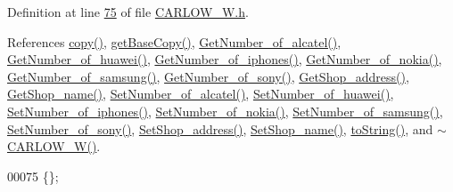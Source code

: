 Definition at line \hyperlink{_c_a_r_l_o_w___w_8h_source_l00075}{75} of file \hyperlink{_c_a_r_l_o_w___w_8h_source}{C\+A\+R\+L\+O\+W\+\_\+\+W.\+h}.



References \hyperlink{_c_a_r_l_o_w___w_8cpp_source_l00037}{copy()}, \hyperlink{_c_a_r_l_o_w___w_8cpp_source_l00024}{get\+Base\+Copy()}, \hyperlink{_c_a_r_l_o_w___w_8cpp_source_l00075}{Get\+Number\+\_\+of\+\_\+alcatel()}, \hyperlink{_c_a_r_l_o_w___w_8cpp_source_l00091}{Get\+Number\+\_\+of\+\_\+huawei()}, \hyperlink{_c_a_r_l_o_w___w_8cpp_source_l00115}{Get\+Number\+\_\+of\+\_\+iphones()}, \hyperlink{_c_a_r_l_o_w___w_8cpp_source_l00083}{Get\+Number\+\_\+of\+\_\+nokia()}, \hyperlink{_c_a_r_l_o_w___w_8cpp_source_l00107}{Get\+Number\+\_\+of\+\_\+samsung()}, \hyperlink{_c_a_r_l_o_w___w_8cpp_source_l00099}{Get\+Number\+\_\+of\+\_\+sony()}, \hyperlink{_c_a_r_l_o_w___w_8cpp_source_l00131}{Get\+Shop\+\_\+address()}, \hyperlink{_c_a_r_l_o_w___w_8cpp_source_l00123}{Get\+Shop\+\_\+name()}, \hyperlink{_c_a_r_l_o_w___w_8cpp_source_l00071}{Set\+Number\+\_\+of\+\_\+alcatel()}, \hyperlink{_c_a_r_l_o_w___w_8cpp_source_l00087}{Set\+Number\+\_\+of\+\_\+huawei()}, \hyperlink{_c_a_r_l_o_w___w_8cpp_source_l00111}{Set\+Number\+\_\+of\+\_\+iphones()}, \hyperlink{_c_a_r_l_o_w___w_8cpp_source_l00079}{Set\+Number\+\_\+of\+\_\+nokia()}, \hyperlink{_c_a_r_l_o_w___w_8cpp_source_l00103}{Set\+Number\+\_\+of\+\_\+samsung()}, \hyperlink{_c_a_r_l_o_w___w_8cpp_source_l00095}{Set\+Number\+\_\+of\+\_\+sony()}, \hyperlink{_c_a_r_l_o_w___w_8cpp_source_l00127}{Set\+Shop\+\_\+address()}, \hyperlink{_c_a_r_l_o_w___w_8cpp_source_l00119}{Set\+Shop\+\_\+name()}, \hyperlink{_c_a_r_l_o_w___w_8cpp_source_l00064}{to\+String()}, and \hyperlink{_c_a_r_l_o_w___w_8cpp_source_l00014}{$\sim$\+C\+A\+R\+L\+O\+W\+\_\+\+W()}.


\begin{DoxyCode}
00075 \{\};
\end{DoxyCode}


